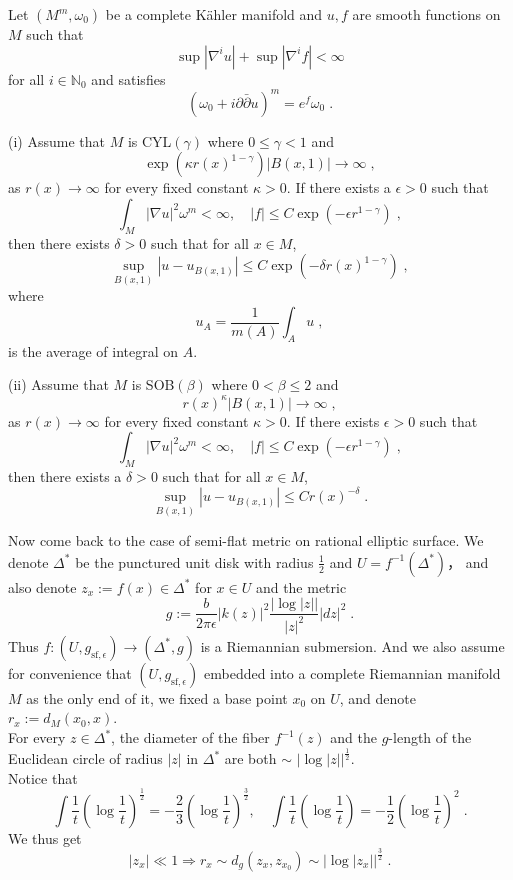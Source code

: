 \begin{prop}
Let $(M^m,\omega_0)$ be a complete K{\"a}hler manifold and $u,f$ are smooth functions on $M $ such that
$$\sup|\nabla^i u|+\sup|\nabla^i f|<\infty  $$
for all $i\in\mathbb{N}_0$ and satisfies
$$(\omega_0+i\partial\bar{\partial}u)^m=e^f\omega_0\; .$$

(i) Assume that $M$ is CYL$(\gamma)$ where $0\leq \gamma<1$ and
$$\exp(\kappa r(x)^{1-\gamma})|B(x,1)|\rightarrow\infty\; ,$$
as $r(x)\rightarrow\infty$ for every fixed constant $\kappa>0$. If there exists a $\epsilon>0$ such that
$$\int_M|\nabla u|^2\omega^m <\infty,\quad |f|\leq C\exp(-\epsilon r^{1-\gamma})\; ,$$
then there exists $\delta>0$ such that for all $x\in M$,
$$\sup_{B(x,1)}|u-u_{B(x,1)}|\leq C\exp(-\delta r(x)^{1-\gamma}) \; ,$$
where $$u_{A}=\frac{1}{m(A)}\int_A u \; ,$$
is the average of integral on $A$.\\ \indent

(ii) Assume that $M$ is SOB$(\beta)$ where $0< \beta\leq 2$ and
$$r(x)^\kappa |B(x,1)|\rightarrow\infty\; ,$$
as $r(x)\rightarrow\infty$ for every fixed constant $\kappa>0$. If there exists $\epsilon>0$ such that
$$\int_M|\nabla u|^2\omega^m<\infty,\quad |f|\leq C\exp(-\epsilon r^{1-\gamma})\; ,$$
then there exists a $\delta>0$ such that for all $x\in M$,
$$\sup_{B(x,1)}|u-u_{B(x,1)}|\leq Cr(x)^{-\delta} \; .$$
\end{prop}
Now come back to the case of semi-flat metric on rational elliptic surface. We denote $\Delta^*$ be the punctured unit disk with radius $\frac{1}{2}$ and $U=f^{-1}(\Delta^*)$， and also denote $z_x:=f(x)\in\Delta^*$ for $x\in U$ and the metric
$$g:=\frac{b}{2\pi \epsilon}|k(z)|^2\frac{|\log|z||}{|z|^2}|dz|^2\; .$$
\indent Thus $f\colon(U,g_{\textrm{sf},\epsilon})\rightarrow(\Delta^*,g)$ is a Riemannian submersion. And we also assume for convenience that $(U,g_{\textrm{sf},\epsilon})$ embedded into a complete Riemannian manifold $M$ as the only end of it, we fixed a base point $x_0$ on $U$, and denote $r_x:=d_M(x_0,x)$.\\ \indent
For every $z\in\Delta^*$, the diameter of the fiber $f^{-1}(z)$ and the $g$-length of the Euclidean circle of radius $|z|$ in $\Delta^*$ are both $\sim$ $|\log|z||^{\frac{1}{2}  }$.\\ \indent
Notice that
$$\int \frac{1}{t}\left(\log \frac{1}{t}\right)^{\frac{1}{2}}=-\frac{2}{3}\left(\log \frac{1}{t} \right)^{\frac{3}{2} },\quad \int \frac{1}{t}\left(\log \frac{1}{t}\right)=-\frac{1}{2}\left(\log \frac{1}{t} \right)^{2}\; . $$
\indent We thus get
$$|z_x|\ll 1\Longrightarrow r_x\sim d_g(z_x,z_{x_0})\sim |\log|z_x||^{\frac{3}{2}}\; .$$
